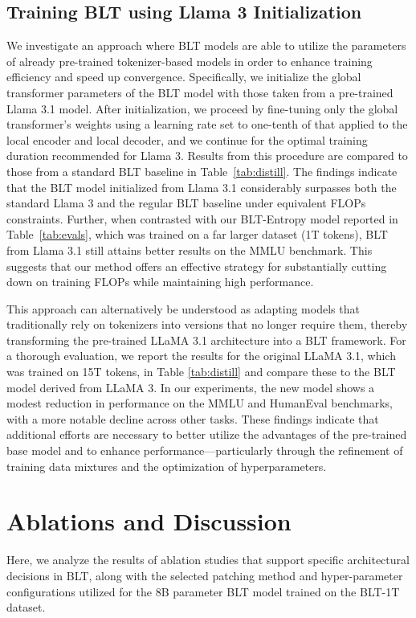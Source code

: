 \subsection{Training {\textsc BLT} using Llama 3 Initialization}
\label{sec:distillation}
We investigate an approach where {\textsc BLT} models are able to utilize the parameters of already pre-trained tokenizer-based models in order to enhance training efficiency and speed up convergence. Specifically, we initialize the global transformer parameters of the {\textsc BLT} model with those taken from a pre-trained Llama 3.1 model. After initialization, we proceed by fine-tuning only the global transformer’s weights using a learning rate set to one-tenth of that applied to the local encoder and local decoder, and we continue for the optimal training duration recommended for Llama 3. Results from this procedure are compared to those from a standard {\textsc BLT} baseline in Table~\ref{tab:distill}. The findings indicate that the {\textsc BLT} model initialized from Llama 3.1 considerably surpasses both the standard Llama 3 and the regular {\textsc BLT} baseline under equivalent FLOPs constraints. Further, when contrasted with our {\textsc BLT}-Entropy model reported in Table~\ref{tab:evals}, which was trained on a far larger dataset (1T tokens), {\textsc BLT} from Llama 3.1 still attains better results on the MMLU benchmark. This suggests that our method offers an effective strategy for substantially cutting down on training FLOPs while maintaining high performance.

This approach can alternatively be understood as adapting models that traditionally rely on tokenizers into versions that no longer require them, thereby transforming the pre-trained LLaMA 3.1 architecture into a {\textsc BLT} framework. For a thorough evaluation, we report the results for the original LLaMA 3.1, which was trained on 15T tokens, in Table \ref{tab:distill} and compare these to the {\textsc BLT} model derived from LLaMA 3. In our experiments, the new model shows a modest reduction in performance on the MMLU and HumanEval benchmarks, with a more notable decline across other tasks. These findings indicate that additional efforts are necessary to better utilize the advantages of the pre-trained base model and to enhance performance—particularly through the refinement of training data mixtures and the optimization of hyperparameters.

\section{Ablations and Discussion}
\label{section:ablations}
Here, we analyze the results of ablation studies that support specific architectural decisions in {\textsc BLT}, along with the selected patching method and hyper-parameter configurations utilized for the 8B parameter {\textsc BLT} model trained on the {\textsc BLT}-1T dataset.

